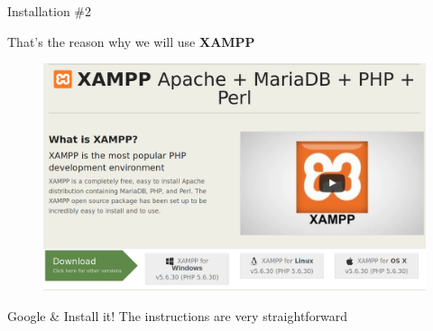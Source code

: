 \begin{frame}{Installation \#{}2}

	That's the reason why we will use \textbf{XAMPP} \pause
	\begin{figure}
  		\includegraphics[width=\linewidth]{img/xampp.png}
	\end{figure}
	
	\pause
	
	Google \& Install it! The instructions are very straightforward
	
\end{frame}



